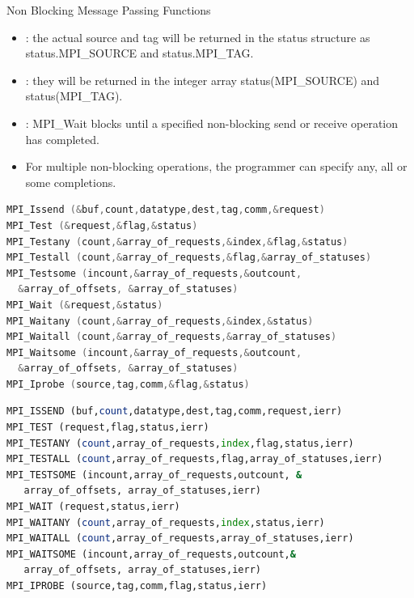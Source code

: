 \documentclass[9pt,c]{beamer}
\begin{document}
\begin{frame}{Non Blocking Message Passing Functions}
\begin{itemize}
    \item[] : the actual source and tag will be returned in the status structure as status.MPI\_SOURCE and status.MPI\_TAG. 
    \item[] : they will be returned in the integer array status(MPI\_SOURCE) and status(MPI\_TAG).
    \item {}: MPI\_Wait blocks until a specified non-blocking send or receive operation has completed. 
    \item[] For multiple non-blocking operations, the programmer can specify any, all or some completions.
  \end{itemize}
  \framebreak
  \begin{block}{}
  \begin{lstlisting}[basicstyle=\scriptsize\ttfamily,language=C]
MPI_Issend (&buf,count,datatype,dest,tag,comm,&request)
MPI_Test (&request,&flag,&status)
MPI_Testany (count,&array_of_requests,&index,&flag,&status)
MPI_Testall (count,&array_of_requests,&flag,&array_of_statuses)
MPI_Testsome (incount,&array_of_requests,&outcount,
  &array_of_offsets, &array_of_statuses)
MPI_Wait (&request,&status)
MPI_Waitany (count,&array_of_requests,&index,&status)
MPI_Waitall (count,&array_of_requests,&array_of_statuses)
MPI_Waitsome (incount,&array_of_requests,&outcount,
  &array_of_offsets, &array_of_statuses)
MPI_Iprobe (source,tag,comm,&flag,&status)
  \end{lstlisting}
  
  \begin{lstlisting}[basicstyle=\scriptsize\ttfamily,language=Fortran]
MPI_ISSEND (buf,count,datatype,dest,tag,comm,request,ierr)
MPI_TEST (request,flag,status,ierr)
MPI_TESTANY (count,array_of_requests,index,flag,status,ierr)
MPI_TESTALL (count,array_of_requests,flag,array_of_statuses,ierr)
MPI_TESTSOME (incount,array_of_requests,outcount, &
   array_of_offsets, array_of_statuses,ierr)
MPI_WAIT (request,status,ierr)
MPI_WAITANY (count,array_of_requests,index,status,ierr)
MPI_WAITALL (count,array_of_requests,array_of_statuses,ierr)
MPI_WAITSOME (incount,array_of_requests,outcount,&
   array_of_offsets, array_of_statuses,ierr)
MPI_IPROBE (source,tag,comm,flag,status,ierr)  
  \end{lstlisting}
  \end{block}
\end{frame}
\end{document}
